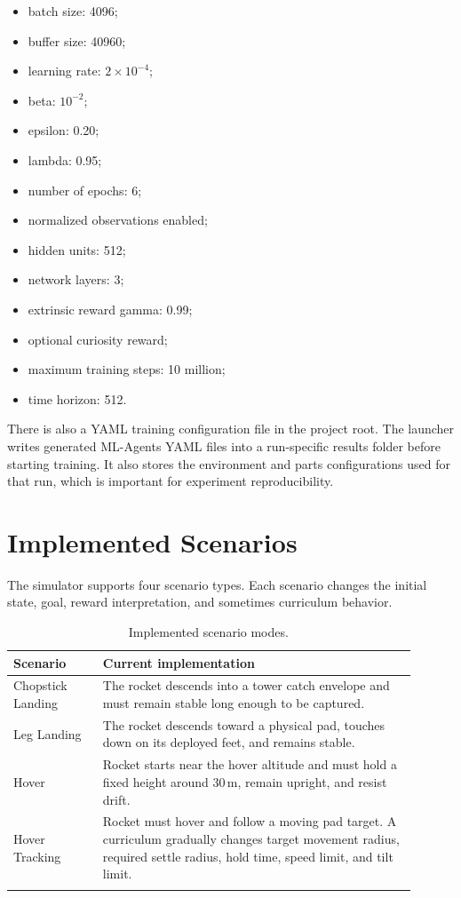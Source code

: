 \documentclass[12pt,a4paper]{article}
\begin{document}
\begin{itemize}
    \item batch size: 4096;
    \item buffer size: 40960;
    \item learning rate: \(2 \times 10^{-4}\);
    \item beta: \(10^{-2}\);
    \item epsilon: 0.20;
    \item lambda: 0.95;
    \item number of epochs: 6;
    \item normalized observations enabled;
    \item hidden units: 512;
    \item network layers: 3;
    \item extrinsic reward gamma: 0.99;
    \item optional curiosity reward;
    \item maximum training steps: 10 million;
    \item time horizon: 512.
\end{itemize}

There is also a YAML training configuration file in the project root. The launcher writes generated ML-Agents YAML files into a run-specific results folder before starting training. It also stores the environment and parts configurations used for that run, which is important for experiment reproducibility.

\section{Implemented Scenarios}

The simulator supports four scenario types. Each scenario changes the initial state, goal, reward interpretation, and sometimes curriculum behavior.

\begin{longtable}{p{0.20\linewidth} p{0.70\linewidth}}
\toprule
\textbf{Scenario} & \textbf{Current implementation} \\
\midrule
\endhead
Chopstick Landing & The rocket descends into a tower catch envelope and must remain stable long enough to be captured. \\
Leg Landing & The rocket descends toward a physical pad, touches down on its deployed feet, and remains stable. \\
Hover & Rocket starts near the hover altitude and must hold a fixed height around \(30\,\mathrm{m}\), remain upright, and resist drift. \\
Hover Tracking & Rocket must hover and follow a moving pad target. A curriculum gradually changes target movement radius, required settle radius, hold time, speed limit, and tilt limit. \\
\bottomrule
\caption{Implemented scenario modes.}
\end{longtable}
\end{document}
